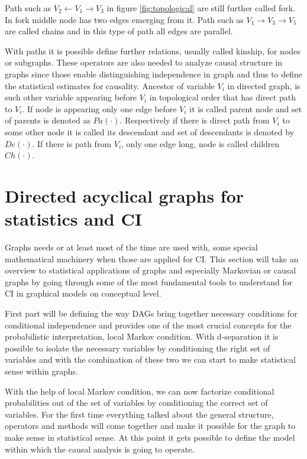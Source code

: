 \documentclass[main=english,12pt,a4paper,pdftex,econ,utf8]{aaltothesis}
\newcommand{\ch}[1]{Ch(#1)}
\newcommand{\pa}[1]{Pa(#1)}
\newcommand{\de}[1]{De(#1)}
\begin{document}
Path such as $V_{2}\leftarrow V_{1}\rightarrow V_{3}$ in figure \ref{fig:topological} are still further called fork. In fork middle node has two edges emerging from it. Path such as $V_{1}\rightarrow V_{3}\rightarrow V_{5}$ are called chains and in this type of path all edges are parallel.

With paths it is possible define further relations, usually called kinship, for nodes or subgraphs. These operators are also needed to analyze causal structure in graphs since those enable distinguishing independence in graph and thus to define the statistical estimates for causality. Ancestor of variable $V_{i}$ in directed graph, is such other variable appearing before $V_{i}$ in topological order that has direct path to $V_{i}$. If node is appearing only one edge before $V_{i}$ it is called parent node and set of parents is denoted as $\pa{\bm{\cdot}}$. Respectively if there is direct path from $V_{i}$ to some other node it is called its descendant and set of descendants is denoted by $\de{\bm{\cdot}}$. If there is path from $V_{i}$, only one edge long, node is called children $\ch{\bm{\cdot}}$.

\clearpage

\section{Directed acyclical graphs for statistics and CI} \label{section:stats and ci}

Graphs needs or at least most of the time are used with, some special mathematical machinery when those are applied for CI. This section will take an overview to statistical applications of graphs and especially Markovian or causal graphs by going through some of the most fundamental tools to understand for CI in graphical models on conceptual level.

First part will be defining the way DAGs bring together necessary conditions for conditional independence and provides one of the most crucial concepts for the probabilistic interpretation, local Markov condition. With d-separation it is possible to isolate the necessary variables by conditioning the right set of variables and with the combination of these two we can start to make statistical sense within graphs.

With the help of local Markov condition, we can now factorize conditional probabilities out of the set of variables by conditioning the correct set of variables. For the first time everything talked about the general structure, operators and methods will come together and make it possible for the graph to make sense in statistical sense. At this point it gets possible to define the model within which the causal analysis is going to operate.
\end{document}
